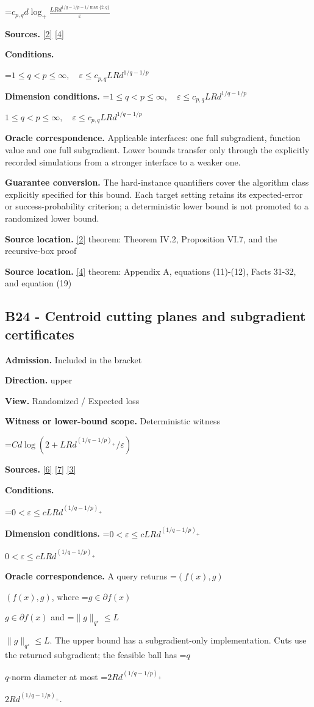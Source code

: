 \documentclass[10pt,a4paper]{article}
\newcommand{\AtlasMath}[1]{\par\begingroup\centering\setbox0=\hbox{$\displaystyle #1$}\ifdim\wd0>1.4\linewidth\typeout{ATLAS WIDE FORMULA: \the\wd0}\fi\ifdim\wd0>\linewidth\resizebox{\linewidth}{!}{\box0}\else\box0\fi\par\endgroup}
\newcommand{\AtlasInlineMath}[1]{\begingroup\setbox0=\hbox{$#1$}\ifdim\wd0>.4\linewidth\endgroup\AtlasMath{#1}\else\endgroup$#1$\fi}
\begin{document}
\AtlasMath{c_{p,q}d\log_+\frac{LRd^{1/q-1/p-1/\max\{2,q\}}}{\varepsilon}}
\textbf{Sources.} \href{https://arxiv.org/pdf/1407.5144}{[2]} \href{https://arxiv.org/pdf/2609.20687}{[4]}

\textbf{Conditions.} 
\AtlasMath{1\le q<p\le\infty,\quad\varepsilon\le c_{p,q}LRd^{1/q-1/p}}


\textbf{Dimension conditions.} \AtlasInlineMath{1\le q<p\le\infty,\quad\varepsilon\le c_{p,q}LRd^{1/q-1/p}}

\textbf{Oracle correspondence.} Applicable interfaces: one full subgradient, function value and one full subgradient. Lower bounds transfer only through the explicitly recorded simulations from a stronger interface to a weaker one.

\textbf{Guarantee conversion.} The hard-instance quantifiers cover the algorithm class explicitly specified for this bound. Each target setting retains its expected-error or success-probability criterion; a deterministic lower bound is not promoted to a randomized lower bound.

\textbf{Source location.} \href{https://arxiv.org/pdf/1407.5144}{[2]} theorem: Theorem IV.2, Proposition VI.7, and the recursive-box proof

\textbf{Source location.} \href{https://arxiv.org/pdf/2609.20687}{[4]} theorem: Appendix A, equations (11)-(12), Facts 31-32, and equation (19)

\subsection{B24 - Centroid cutting planes and subgradient certificates}
\textbf{Admission.} Included in the bracket

\textbf{Direction.} upper

\textbf{View.} Randomized / Expected loss

\textbf{Witness or lower-bound scope.} Deterministic witness

\AtlasMath{C d\log(2+LRd^{(1/q-1/p)_+}/\varepsilon)}
\textbf{Sources.} \href{https://arxiv.org/pdf/1405.4980}{[6]} \href{https://www2.isye.gatech.edu/~nemirovs/MOR_AccuracyCertificates.pdf}{[7]} \href{https://arxiv.org/pdf/2609.20701}{[3]}

\textbf{Conditions.} 
\AtlasMath{0<\varepsilon\le c LRd^{(1/q-1/p)_+}}


\textbf{Dimension conditions.} \AtlasInlineMath{0<\varepsilon\le c LRd^{(1/q-1/p)_+}}

\textbf{Oracle correspondence.} A query returns \AtlasInlineMath{(f(x),g)}, where \AtlasInlineMath{g\in\partial f(x)} and \AtlasInlineMath{\|g\|_{q^\star}\le L}. The upper bound has a subgradient-only implementation. Cuts use the returned subgradient; the feasible ball has \AtlasInlineMath{q}-norm diameter at most \AtlasInlineMath{2Rd^{(1/q-1/p)_+}}.
\end{document}
